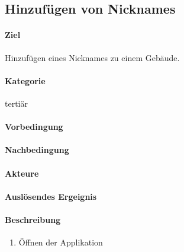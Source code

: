 \subsection{Hinzufügen von Nicknames}
\label{Hinzufügen von Nicknames}
\paragraph{Ziel}
Hinzufügen eines Nicknames zu einem Gebäude.
\paragraph{Kategorie}
tertiär
\paragraph{Vorbedingung}

\paragraph{Nachbedingung}

\paragraph{Akteure}

\paragraph{Auslösendes Ergeignis}

\paragraph{Beschreibung}
\begin{enumerate}
    \item Öffnen der Applikation
\end{enumerate}